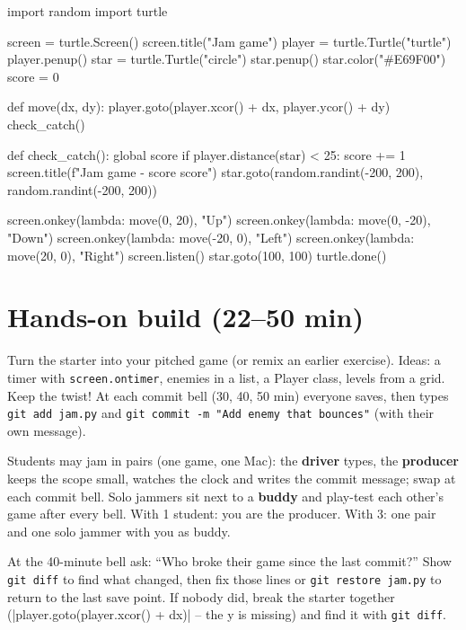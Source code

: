 \begin{pycode}
import random
import turtle

screen = turtle.Screen()
screen.title("Jam game")
player = turtle.Turtle("turtle")
player.penup()
star = turtle.Turtle("circle")
star.penup()
star.color("#E69F00")
score = 0

def move(dx, dy):
    player.goto(player.xcor() + dx, player.ycor() + dy)
    check_catch()

def check_catch():
    global score
    if player.distance(star) < 25:
        score += 1
        screen.title(f"Jam game - score {score}")
        star.goto(random.randint(-200, 200), random.randint(-200, 200))

screen.onkey(lambda: move(0, 20), "Up")
screen.onkey(lambda: move(0, -20), "Down")
screen.onkey(lambda: move(-20, 0), "Left")
screen.onkey(lambda: move(20, 0), "Right")
screen.listen()
star.goto(100, 100)
turtle.done()
\end{pycode}

\section{Hands-on build (22--50 min)}
\begin{freebuild}
Turn the starter into your pitched game (or remix an earlier exercise). Ideas: a timer with \texttt{screen.ontimer}, enemies in a list, a Player class, levels from a grid. Keep the twist! At each commit bell (30, 40, 50 min) everyone saves, then types \texttt{git add jam.py} and \texttt{git commit -m "Add enemy that bounces"} (with their own message).
\end{freebuild}

\begin{pairroles}
Students may jam in pairs (one game, one Mac): the \textbf{driver} types, the \textbf{producer} keeps the scope small, watches the clock and writes the commit message; swap at each commit bell. Solo jammers sit next to a \textbf{buddy} and play-test each other's game after every bell. With 1 student: you are the producer. With 3: one pair and one solo jammer with you as buddy.
\end{pairroles}

\begin{bughunt}
At the 40-minute bell ask: \enquote{Who broke their game since the last commit?} Show \texttt{git diff} to find what changed, then fix those lines or \texttt{git restore jam.py} to return to the last save point. If nobody did, break the starter together (\py|player.goto(player.xcor() + dx)| -- the y is missing) and find it with \texttt{git diff}.
\end{bughunt}

